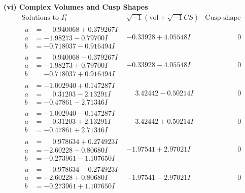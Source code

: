 \documentclass[1p]{elsarticle_modified}
\theoremstyle{definition}
\newcommand{\I}{\sqrt{-1}}
\begin{document}
\newpage\flushleft \textbf{(vi) Complex Volumes and Cusp Shapes}
$$\begin{array}{c|c|c}  
\text{Solutions to }I^u_{1}& \I (\text{vol} + \sqrt{-1}CS) & \text{Cusp shape}\\
 \hline 
\begin{aligned}
u &= \phantom{-}0.940068 + 0.379267 I \\
a &= -1.98273 - 0.79700 I \\
b &= -0.718037 - 0.916494 I\end{aligned}
 & -0.33928 + 4.05548 I & \phantom{-0.000000 } 0 \\ \hline\begin{aligned}
u &= \phantom{-}0.940068 - 0.379267 I \\
a &= -1.98273 + 0.79700 I \\
b &= -0.718037 + 0.916494 I\end{aligned}
 & -0.33928 - 4.05548 I & \phantom{-0.000000 } 0 \\ \hline\begin{aligned}
u &= -1.002940 + 0.147287 I \\
a &= \phantom{-}0.31203 - 2.13291 I \\
b &= -0.47861 - 2.71346 I\end{aligned}
 & \phantom{-}3.42442 - 0.50214 I & \phantom{-0.000000 } 0 \\ \hline\begin{aligned}
u &= -1.002940 - 0.147287 I \\
a &= \phantom{-}0.31203 + 2.13291 I \\
b &= -0.47861 + 2.71346 I\end{aligned}
 & \phantom{-}3.42442 + 0.50214 I & \phantom{-0.000000 } 0 \\ \hline\begin{aligned}
u &= \phantom{-}0.978634 + 0.274923 I \\
a &= -2.60228 - 0.80680 I \\
b &= -0.273961 - 1.107650 I\end{aligned}
 & -1.97541 + 2.97021 I & \phantom{-0.000000 } 0 \\ \hline\begin{aligned}
u &= \phantom{-}0.978634 - 0.274923 I \\
a &= -2.60228 + 0.80680 I \\
b &= -0.273961 + 1.107650 I\end{aligned}
 & -1.97541 - 2.97021 I & \phantom{-0.000000 } 0 \\ \hline\begin{aligned}

\end{aligned}
\end{array}$$
\end{document}

